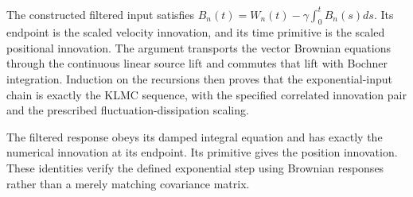 \documentclass[11pt,a4paper]{article}
\begin{document}
The constructed filtered input satisfies \(B_n(t)=W_n(t)-\gamma\int_0^tB_n(s)ds\). Its endpoint is the scaled velocity innovation, and its time primitive is the scaled positional innovation. The argument transports the vector Brownian equations through the continuous linear source lift and commutes that lift with Bochner integration. Induction on the recursions then proves that the exponential-input chain is exactly the KLMC sequence, with the specified correlated innovation pair and the prescribed fluctuation-dissipation scaling.



The filtered response obeys its damped integral equation and has exactly the numerical innovation at its endpoint. Its primitive gives the position innovation. These identities verify the defined exponential step using Brownian responses rather than a merely matching covariance matrix.
\end{document}

